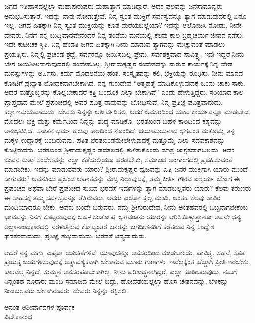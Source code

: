 ಜಗದ ಇತಿಹಾಸದಲ್ಲೆಲ್ಲಾ ಮಹಾಪುರುಷರು ಮಹಾತ್ಯಾಗ ಮಾಡಿದ್ದಾರೆ. ಅದರ ಫಲವನ್ನು ಜನಸಾಮಾನ್ಯರು ಅನುಭವಿಸುತ್ತಾರೆ. ಇದನ್ನು ನಾವು ನೋಡುತ್ತೇವೆ. ನಿನ್ನ ಸ್ವಂತ ಮುಕ್ತಿಗೆ ಸರ್ವಸ್ವವನ್ನೂ ತ್ಯಾಗ ಮಾಡುವುದರಲ್ಲಿ ಏನೂ ಇಲ್ಲ. ಜಗದ ಹಿತಕ್ಕಾಗಿ ನಿನ್ನ ಸ್ವಂತ ಮುಕ್ತಿಯನ್ನು ಕೂಡ ಮರೆಯಬಲ್ಲೆಯಾ? ಇದನ್ನು ಆಲೋಚಿಸಿ ನೋಡು, ನೀನೇ ದೇವರು. ನಿನಗೆ ನನ್ನ ಬುದ್ಧಿವಾದವೇನೆಂದರೆ ನಿನ್ನ ತಂದೆಯ ಮನೆಯಲ್ಲಿ ಕೆಲವು ಕಾಲ ಬ್ರಹ್ಮಚರ್ಯ ಜೀವನ ನಡೆಸು. ಇದೇ ಕುಟೀಚಕ ಸ್ಥಿತಿ. ನಿನ್ನ ಹೆಂಡತಿ ಜಗದ ಹಿತಕ್ಕಾಗಿ ನೀನು ಮಾಡುವ ತ್ಯಾಗವನ್ನು ಮೆಚ್ಚುವಂತೆ ಮಾಡಲು ಪ್ರಯತ್ನಿಸು. ನಿನ್ನಲ್ಲಿ ಪ್ರಚಂಡ ಶ್ರದ್ದೆ, ಸರ್ವರನ್ನೂ ಜಯಿಸಬಲ್ಲ ಪ್ರೇಮ, ಸರ್ವಶಕ್ತವಾದ ಪಾವಿತ್ರ್ಯ, ಇವು ಇದ್ದರೆ ನೀನು ಬೇಗ ಜಯಶೀಲನಾಗುವುದರಲ್ಲಿ ಸಂದೇಹವಿಲ್ಲ. ಶ‍್ರೀರಾಮಕೃಷ್ಣರ ಸಂದೇಶವನ್ನು ಸಾರುವ ಕಾರ್ಯಕ್ಕೆ ನಿನ್ನ ದೇಹ ಮನಸ್ಸುಗಳನ್ನು ಅರ್ಪಿಸು. ಕರ್ಮ ಮೊದಲನೆಯ ಹಂತ. ಸಂಸ್ಕೃತವನ್ನು ಕಲಿ, ಭಕ್ತಿಯನ್ನು ರೂಢಿಸು. ನೀನು ಮಾನವ ಕೋಟಿಗೆ ಪ್ರಖ್ಯಾತ ಬೋಧಕನಾಗಬೇಕಾಗಿದೆ. ನನ್ನ ಗುರುದೇವ ``ಆತ್ಮಹತ್ಯೆ ಮಾಡಿಕೊಳ್ಳುವುದಕ್ಕೆ ಒಂದು ಚಾಕು ಸಾಕು. ಆದರೆ ಮತ್ತೊಬ್ಬರನ್ನು ಕೊಲ್ಲಬೇಕಾದರೆ ಕತ್ತಿ ಬಂದೂಕ ಎಲ್ಲಾ ಬೇಕಾಗಿವೆ'' ಎಂದು ಹೇಳುತ್ತಿದ್ದರು. ಸರಿಯಾದ ಕಾಲ ಪ್ರಾಪ್ತವಾದ ಮೇಲೆ ಪ್ರಪಂಚದಲ್ಲಿ ಅವರ ಪವಿತ್ರ ನಾಮವನ್ನು ಬೋಧಿಸುವೆ. ನಿನ್ನ ಪ್ರತಿಜ್ಞೆ ಪವಿತ್ರವಾದುದು, ಕಲ್ಯಾಣಮಯವಾದುದು. ದೇವರು ನಿನ್ನನ್ನು ಆಶೀರ್ವದಿಸಲಿ. ಆದರೆ ಅವಸರದಿಂದ ಯಾವ ಕಾರ್ಯವನ್ನೂ ಮಾಡಬೇಡ. ಮೊದಲು ಭಕ್ತಿ ಮತ್ತು ಕರ್ಮದಿಂದ ನಿನ್ನನ್ನು ಶುದ್ಧ ಮಾಡಿಕೊ. ಭರತಖಂಡ ಬಹಳ ಕಾಲದಿಂದ ಕಷ್ಟವನ್ನು ಅನುಭವಿಸಿದೆ. ಸನಾತನ ಧರ್ಮ ಹಲವು ಕಾಲದಿಂದ ನೊಂದಿದೆ. ದಯಾಮಯನಾದ ಭಗವಂತ ಮತ್ತೊಮ್ಮೆ ತನ್ನ ಮಕ್ಕಳ ಉದ್ದಾರಕ್ಕೆ ಬಂದಿರುವನು. ಪತಿತ ಭರತಖಂಡಮೇಲೇಳುವುದಕ್ಕೆ ಮತ್ತೊಮ್ಮೆ ಎಲ್ಲಾ ಸದವಕಾಶವನ್ನು ಕೊಟ್ಟಿರುವನು. ಭರತಖಂಡ ಶ‍್ರೀರಾಮಕೃಷ್ಣರ ಪದತಲದಲ್ಲಿ ಕುಳಿತುಕೊಂಡು ಮಾತ್ರ ಜಾಗ್ರತವಾಗಬಲ್ಲದು. ಅವರ ಜೀವನ ಮತ್ತು ಸಂದೇಶವನ್ನು ಎಲ್ಲಾ ಕಡೆಯಲ್ಲಿಯೂ ಹರಡಬೇಕು, ಸಮಾಜದ ಅಂಗಾಂಗದಲ್ಲಿ ಪ್ರವಹಿಸುವಂತೆ ಮಾಡಬೇಕು. ಇದನ್ನು ಮಾಡುವವರು ಯಾರು? ಶ‍್ರೀರಾಮಕೃಷ್ಣರ ಧ್ವಜವನ್ನು ಎತ್ತಿ ಜನರ ಮುಕ್ತಿಗಾಗಿ ಯಾರು ಮುಂದೆ ಸಾಗುವರು? ಅವನತಿಯ ಪ್ರಚಂಡ ಆಘಾತವನ್ನು ಮೆಟ್ಟಿ ನಿಲ್ಲುವುದಕ್ಕೆ, ತಮ್ಮ ಕೀರ್ತಿ ಗೌರವ ಐಶ್ವರ್ಯ ಭೋಗ ಈ ಪ್ರಪಂಚದ ಅಥವಾ ಬೇರೆ ಪ್ರಪಂಚದ ಸುಖದ ಭರವಸೆ\enginline{-} ಇವುಗಳನ್ನು ತ್ಯಾಗ ಮಾಡಬಲ್ಲವರು ಯಾರು? ಕೆಲವು ತರುಣರು ಈ ಸಾಹಸಕ್ಕೆ ತಮ್ಮ ಸರ್ವಸ್ವವನ್ನೂ ತೆತ್ತಿರುವರು. ಅವರು ಎಲ್ಲೋ ಸ್ವಲ್ಪ ಮಂದಿ. ಅಂತಹ ಕೆಲವು ಸಾವಿರ ಮಂದಿಯಾದರೂ ಬೇಕು. ಅವರು ಬಂದೇ ಬರುವರು. ನಮ್ಮ ಶ‍್ರೀಗುರುದೇವ, ನೀನು ಅಂತಹವರಲ್ಲಿ ಒಬ್ಬನಾಗಬೇಕೆಂಬ ಭಾವವನ್ನು ನಿನಗೆ ಕೊಟ್ಟಿರುವುದಕ್ಕೆ ಬಹಳ ಸಂತೋಷ. ಭಗವಂತನು ಯಾರನ್ನು ಆರಿಸಿಕೊಳ್ಳುತ್ತಾನೋ ಅವನೇ ಧನ್ಯ. ಅಜ್ಞಾನಾಂಧಕಾರದಲ್ಲಿ ನರಳುತ್ತಿರುವ ಕೋಟ್ಯಂತರ ಜನರನ್ನು ಜಗದೀಶನಡಿಗೆ ಕರೆತರುವ ನಿನ್ನ ಉದ್ದೇಶ ಘನತರವಾದುದು, ಪ್ರತಿಜ್ಞೆ ಶುಭವಾದುದು, ಭರವಸೆ ಭವ್ಯವಾದುದು.

ಆದರೆ ನನ್ನ ಮಗು, ಎಷ್ಟೋ ಅಡಚಣೆಗಳಿವೆ. ಯಾವುದನ್ನೂ ಅವಸರದಿಂದ ಮಾಡಬಾರದು. ಪಾವಿತ್ರ್ಯ, ಸಹನೆ, ಸತತ ಪ್ರಯತ್ನ ಜಯಗಳಿಸುವುದಕ್ಕೆ ಅತ್ಯಾವಶ್ಯಕವಾಗಿ ಬೇಕಾಗುವ ಮೂರು ಗುಣಗಳು. ಇವೆಲ್ಲಕ್ಕಿಂತ ಹೆಚ್ಚಾಗಿ ಪ್ರೀತಿ ಇರಬೇಕು. ಕಾಲವೆಲ್ಲ ನಿನ್ನದೆ. ಸುಮ್ಮನೆ ಅವಸರಪಡಬೇಕಾಗಿಲ್ಲ. ನೀನು ಪರಿಶುದ್ಧನಾಗಿದ್ದರೆ, ಎಲ್ಲಾ ಕೂಡಿಬರುವುದು. ನಮಗೆ ನಿನ್ನಂತಹ ನೂರಾರು ಮಂದಿ ಸಮಾಜದ ಮೇಲೆ ಬಿದ್ದು, ಹೋದೆಡೆಯಲ್ಲೆಲ್ಲಾ ಹೊಸ ಚೇತನವನ್ನು, ಬೆಳಕನ್ನು ನೀಡಬಲ್ಲವರು ಬೇಕಾಗಿರುವರು. ದೇವರು ನಿನ್ನನ್ನು ರಕ್ಷಿಸಲಿ.

{\flushright
ಅನಂತ ಆಶೀರ್ವಾದಗಳ ಪೂರ್ವಕ\\ವಿವೇಕಾನಂದ\par}

